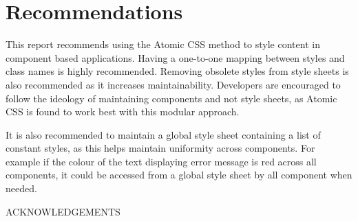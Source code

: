 \documentclass[12pt]{article}
\begin{document}
\newpage

\section{Recommendations}
This report recommends using the Atomic CSS method to style content in component based applications. Having a one-to-one mapping between styles and class names is highly recommended. Removing obsolete styles from style sheets is also recommended as it increases maintainability. Developers are encouraged to follow the ideology of maintaining components and not style sheets, as Atomic CSS is found to work best with this modular approach.

It is also recommended to maintain a global style sheet containing a list of constant styles, as this helps maintain uniformity across components. For example if the colour of the text displaying error message is red across all components, it could be accessed from a global style sheet by all component when needed. 


\newpage



\newpage


ACKNOWLEDGEMENTS
\newpage


\end{document}
